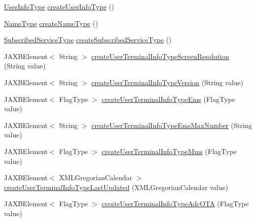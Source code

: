 \begin{DoxyCompactItemize}
\item 
\hyperlink{classcom_1_1telefonica_1_1schemas_1_1unica_1_1rest_1_1directory_1_1v1_1_1UserInfoType}{UserInfoType} \hyperlink{classcom_1_1telefonica_1_1schemas_1_1unica_1_1rest_1_1directory_1_1v1_1_1ObjectFactory_ab12dafa50d383d6ed518159b598ea297}{createUserInfoType} ()
\item 
\hyperlink{classcom_1_1telefonica_1_1schemas_1_1unica_1_1rest_1_1directory_1_1v1_1_1NameType}{NameType} \hyperlink{classcom_1_1telefonica_1_1schemas_1_1unica_1_1rest_1_1directory_1_1v1_1_1ObjectFactory_a3fd77d718de5663c808c07fec29399ea}{createNameType} ()
\item 
\hyperlink{classcom_1_1telefonica_1_1schemas_1_1unica_1_1rest_1_1directory_1_1v1_1_1SubscribedServiceType}{SubscribedServiceType} \hyperlink{classcom_1_1telefonica_1_1schemas_1_1unica_1_1rest_1_1directory_1_1v1_1_1ObjectFactory_a0ec12d1fd452b70a3b709a3a249db57c}{createSubscribedServiceType} ()
\item 
JAXBElement$<$ String $>$ \hyperlink{classcom_1_1telefonica_1_1schemas_1_1unica_1_1rest_1_1directory_1_1v1_1_1ObjectFactory_aea7624669dd1044ba6b0c90c0105b789}{createUserTerminalInfoTypeScreenResolution} (String value)
\item 
JAXBElement$<$ String $>$ \hyperlink{classcom_1_1telefonica_1_1schemas_1_1unica_1_1rest_1_1directory_1_1v1_1_1ObjectFactory_a1268a5c5ed666f9f3330655216309875}{createUserTerminalInfoTypeVersion} (String value)
\item 
JAXBElement$<$ FlagType $>$ \hyperlink{classcom_1_1telefonica_1_1schemas_1_1unica_1_1rest_1_1directory_1_1v1_1_1ObjectFactory_a5bfaec6baf1f50a691611680b439addb}{createUserTerminalInfoTypeEms} (FlagType value)
\item 
JAXBElement$<$ String $>$ \hyperlink{classcom_1_1telefonica_1_1schemas_1_1unica_1_1rest_1_1directory_1_1v1_1_1ObjectFactory_a2de22bc35ceae50f66d9e3d957413c5b}{createUserTerminalInfoTypeEmsMaxNumber} (String value)
\item 
JAXBElement$<$ FlagType $>$ \hyperlink{classcom_1_1telefonica_1_1schemas_1_1unica_1_1rest_1_1directory_1_1v1_1_1ObjectFactory_a179bc81fa02c1f5f015cde1bd244bc26}{createUserTerminalInfoTypeMms} (FlagType value)
\item 
JAXBElement$<$ XMLGregorianCalendar $>$ \hyperlink{classcom_1_1telefonica_1_1schemas_1_1unica_1_1rest_1_1directory_1_1v1_1_1ObjectFactory_a8e889e4ee8ced3d250f15cd2a847990d}{createUserTerminalInfoTypeLastUpdated} (XMLGregorianCalendar value)
\item 
JAXBElement$<$ FlagType $>$ \hyperlink{classcom_1_1telefonica_1_1schemas_1_1unica_1_1rest_1_1directory_1_1v1_1_1ObjectFactory_a153fcff9508b48ad9061ea9f0ce0d53e}{createUserTerminalInfoTypeAdcOTA} (FlagType value)

\end{DoxyCompactItemize}
